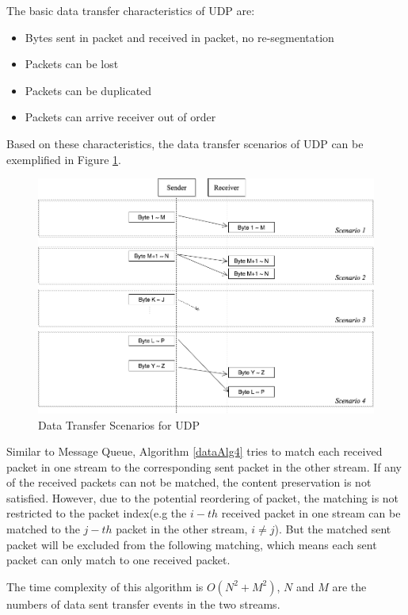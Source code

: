 The basic data transfer characteristics of UDP are:
\begin{itemize}
  \item Bytes sent in packet and received in packet, no re-segmentation
  \item Packets can be lost
  \item Packets can be duplicated
  \item Packets can arrive receiver out of order
\end{itemize}

Based on these characteristics, the data transfer scenarios of UDP can be exemplified in Figure \ref{upd}.
\begin{figure}[H]
\centerline{\includegraphics[scale=0.4]{Figures/udp}}
 \caption{Data Transfer Scenarios for UDP}
\label{upd}
\end{figure}

Similar to Message Queue, Algorithm \ref{dataAlg4} tries to match each received packet in one stream to the corresponding sent packet in the other stream. If any of the received packets can not be matched, the content preservation is not satisfied. However, due to the potential reordering of packet, the matching is not restricted to the packet index(e.g the $i-th$ received packet in one stream can be matched to the $j-th$ packet in the other stream, $i \neq j$). But the matched sent packet will be excluded from the following matching, which means each sent packet can only match to one received packet.

The time complexity of this algorithm is $O(N^2+M^2)$, $N$ and $M$ are the numbers of data sent transfer events in the two streams.

